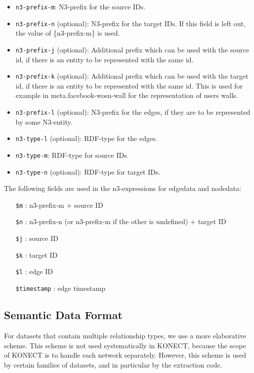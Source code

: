 \documentclass{article}
\begin{document}
\begin{itemize}
\begin{itemize}
  \item \texttt{n3-prefix-m}: N3-prefix for the
    source IDs.
  \item \texttt{n3-prefix-n} (optional): N3-prefix
    for the target IDs. If this field is left out,
    the value of \{n3-prefix-m\} is used.
  \item \texttt{n3-prefix-j} (optional):
    Additional prefix which can be used with the
    source id, if there is an entity to be
    represented with the same id.
  \item \texttt{n3-prefix-k} (optional):
    Additional prefix which can be used with the
    target id, if there is an entity to be
    represented with the same id. This is used for
    example in meta.facebook-wosn-wall for the
    representation of users walls.
  \item \texttt{n3-prefix-l} (optional): N3-prefix
    for the edges, if they are to be represented
    by some N3-entity.
  \item \texttt{n3-type-l} (optional): RDF-type
    for the edges.
  \item \texttt{n3-type-m}: RDF-type for source
    IDs.
  \item \texttt{n3-type-n} (optional): RDF-type
    for target IDs.
  \end{itemize}
  The following fields are used in the n3-expressions for
  edgedata and nodedata:
  \begin{itemize}
  \item[\texttt{\$m}]: n3-prefix-m + source ID
  \item[\texttt{\$n}]: n3-prefix-n (or n3-prefix-m
    if the other is undefined) + target ID
  \item[\texttt{\$j}]: source ID
  \item[\texttt{\$k}]: target ID
  \item[\texttt{\$l}]: edge ID
  \item[\texttt{\$timestamp}]: edge timestamp
  \end{itemize}
\end{itemize}

\subsection{Semantic Data Format}
For datasets that contain multiple relationship types, we use a more
elaborative scheme.  This scheme is not used systematically in KONECT,
because the scope of KONECT is to handle each network separately.
However, this scheme is used by certain families of datasets, and in
particular by the extraction code. 
\end{document}
